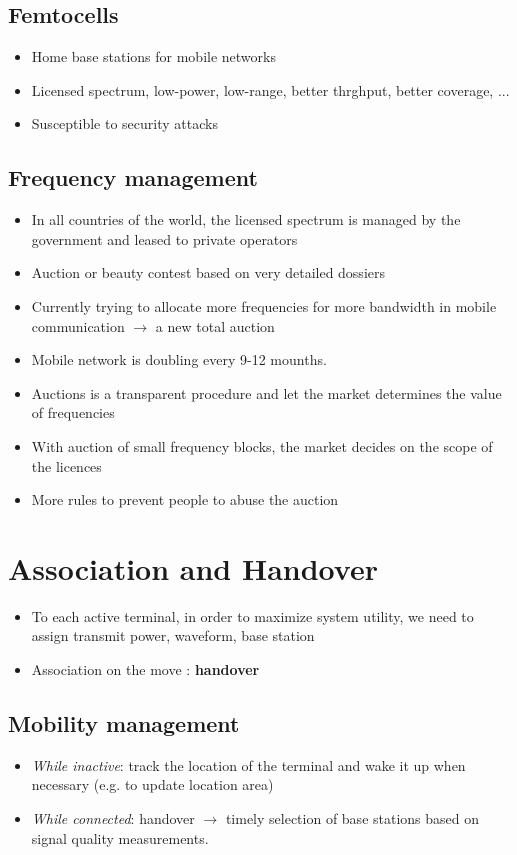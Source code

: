 \subsection{Femtocells}
\begin{itemize}
	\item Home base stations for mobile networks
	\item Licensed spectrum, low-power, low-range, better thrghput, better coverage, ...
	\item Susceptible to security attacks
\end{itemize}
\subsection{Frequency management}
\begin{itemize}
	\item In all countries of the world, the licensed spectrum is managed by the government and leased to private operators
	\item Auction or beauty contest based on very detailed dossiers
	\item Currently trying to allocate more frequencies for more bandwidth in mobile communication $\rightarrow$ a new total auction
	\item Mobile network is doubling every 9-12 mounths.
	\item Auctions is a transparent procedure and let the market determines the value of frequencies
	\item With auction of small frequency blocks, the market decides on the scope of the licences
	\item More rules to prevent people to abuse the auction
\end{itemize}
\section{Association and Handover}
\begin{itemize}
	\item To each active terminal, in order to maximize system utility, we need to assign transmit power, waveform, base station
	\item Association on the move : \textbf{handover}
\end{itemize}
\subsection{Mobility management}
\begin{itemize}
	\item \textit{While inactive}: track the location of the terminal and wake it up when necessary (e.g. to update location area)
	\item \textit{While connected}: handover $\rightarrow$ timely selection of base stations based on signal quality measurements.
\end{itemize}
